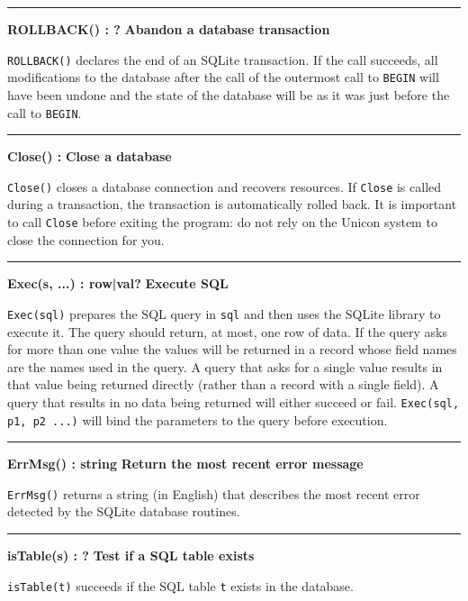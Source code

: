 \bigskip\hrule\vspace{0.1cm}
\noindent
{\bf ROLLBACK() : ? } \hfill {\bf Abandon a database transaction}

\noindent
\texttt{ROLLBACK()} declares the end of an SQLite transaction. If the call
succeeds, all modifications to the database after the call of the
outermost call to \texttt{BEGIN} will have been undone and the state of
the database will be as it was just before the call to \texttt{BEGIN}.

\bigskip\hrule\vspace{0.1cm}
\noindent
{\bf Close() : } \hfill {\bf Close a database}

\noindent
\texttt{Close()} closes a database connection and recovers resources. If
\texttt{Close} is called during a transaction, the transaction is automatically
rolled back. It is important to call \texttt{Close} before exiting the program:
do not rely on the Unicon system to close the connection for you.

\bigskip\hrule\vspace{0.1cm}
\noindent
{\bf Exec(s, ...) : row|val? } \hfill {\bf Execute SQL}

\noindent
\texttt{Exec(sql)} prepares the SQL query in \texttt{sql} and then uses the
SQLite library to execute it. The query should return, at most, one row of data.
If the query asks for more than one value the values will be returned in a
record whose field names are the names used in the query. A query that asks for a
single value results in that value being returned directly (rather than a record
with a single field). A query that results in no data being returned will either
succeed or fail.  \texttt{Exec(sql, p1, p2 ...)}  will bind the parameters to
the query before execution.

\bigskip\hrule\vspace{0.1cm}
\noindent
{\bf ErrMsg() : string } \hfill {\bf Return the most recent error message}

\noindent
\texttt{ErrMsg()} returns a string (in English) that describes the most recent
error detected by the SQLite database routines.

\bigskip\hrule\vspace{0.1cm}
\noindent
{\bf isTable(s) :  ? } \hfill {\bf Test if a SQL table exists}

\noindent
\texttt{isTable(t)} succeeds if the SQL table \texttt{t} exists in the database.

